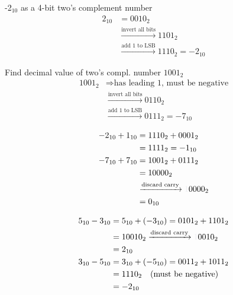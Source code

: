 \begin{minipage}{0.48\linewidth}
-2$_{10}$ as a 4-bit two's complement number
\begin{align*}
  2_{10} & = 0010_{2} \\
         & \xrightarrow{\text{invert all bits}} 1101_{2}\\
         & \xrightarrow{\text{add 1 to LSB}} 1110_{2} = -2_{10}
\end{align*}
\end{minipage}
\begin{minipage}{0.5\linewidth}
Find decimal value of two's compl. number $1001_{2}$
\begin{align*}
  1001_{2} & \Rightarrow{\text{has leading 1, must be negative}} \\
           & \xrightarrow{\text{invert all bits}} 0110_{2} \\
           & \xrightarrow{\text{add 1 to LSB}} 0111_{2} = -7_{10}
\end{align*}
\end{minipage}
\begin{minipage}{0.5\linewidth}
\begin{align*}
  -2_{10} + 1_{10} & = 1110_{2} + 0001_{2} \\
                   & = 1111_{2} = -1_{10} \\
  -7_{10} + 7_{10} & = 1001_{2} + 0111_{2} \\
                   & = 10000_{2} \\
                   &\xrightarrow{\text{discard carry}} \dimtxt{1}0000_{2} \\
  & = 0_{10}
\end{align*}
\end{minipage}
\begin{minipage}{0.5\linewidth}
\begin{align*}
  5_{10} - 3_{10} & = 5_{10} + (-3_{10}) = 0101_{2} + 1101_{2} \\
                  & = 10010_{2} \xrightarrow{\text{discard carry}} \dimtxt{1}0010_{2}\\
                  & = 2_{10} \\
  3_{10} - 5_{10} & = 3_{10} + (-5_{10}) = 0011_{2} + 1011_{2} \\
                  & = 1110_{2} \quad (\text{must be negative}) \\
                  & = -2_{10}
\end{align*}
\end{minipage}


